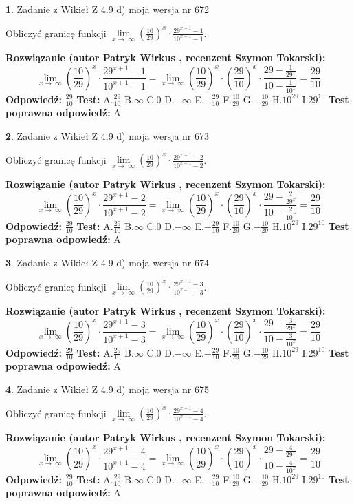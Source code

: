 \documentclass[12pt, a4paper]{article}
\theoremstyle{definition} %
\newtheorem{zad}{}
\newcommand{\zadStart}[1]{\begin{zad}#1\newline}
\newcommand{\zadStop}{\end{zad}}
\newcommand{\rozwStart}[2]{\noindent \textbf{Rozwiązanie (autor #1 , recenzent #2): }\newline}
\newcommand{\rozwStop}{\newline}
\newcommand{\odpStart}{\noindent \textbf{Odpowiedź:}\newline}
\newcommand{\odpStop}{\newline}
\newcommand{\testStart}{\noindent \textbf{Test:}\newline}
\newcommand{\testStop}{\newline}
\newcommand{\kluczStart}{\noindent \textbf{Test poprawna odpowiedź:}\newline}
\newcommand{\kluczStop}{\newline}
\begin{document}
\zadStart{Zadanie z Wikieł Z 4.9 d) moja wersja nr 672}


Obliczyć granicę funkcji  $\lim\limits_{x\to\ \infty}(\frac{10}{29})^{x}\cdot\frac{29^{x+1}-1}{10^{x+1}-1}$.
\zadStop
\rozwStart{Patryk Wirkus}{Szymon Tokarski}
$$\lim\limits_{x\to\ \infty}(\frac{10}{29})^{x}\cdot\frac{29^{x+1}-1}{10^{x+1}-1}=\lim\limits_{x\to\ \infty}(\frac{10}{29})^{x}\cdot(\frac{29}{10})^{x} \cdot \frac{29-\frac{1}{29^{x}}}{10-\frac{1}{10^{x}}} = \frac{29}{10}$$
\rozwStop
\odpStart
$\frac{29}{10}$
\odpStop
\testStart
A.$\frac{29}{10}$ B.$\infty$ C.$0$ D.$-\infty$ E.$-\frac{29}{10}$
F.$\frac{10}{29}$ G.$-\frac{10}{29}$
H.$10^{29}$
I.$29^{10}$
\testStop
\kluczStart
A
\kluczStop



\zadStart{Zadanie z Wikieł Z 4.9 d) moja wersja nr 673}


Obliczyć granicę funkcji  $\lim\limits_{x\to\ \infty}(\frac{10}{29})^{x}\cdot\frac{29^{x+1}-2}{10^{x+1}-2}$.
\zadStop
\rozwStart{Patryk Wirkus}{Szymon Tokarski}
$$\lim\limits_{x\to\ \infty}(\frac{10}{29})^{x}\cdot\frac{29^{x+1}-2}{10^{x+1}-2}=\lim\limits_{x\to\ \infty}(\frac{10}{29})^{x}\cdot(\frac{29}{10})^{x} \cdot \frac{29-\frac{2}{29^{x}}}{10-\frac{2}{10^{x}}} = \frac{29}{10}$$
\rozwStop
\odpStart
$\frac{29}{10}$
\odpStop
\testStart
A.$\frac{29}{10}$ B.$\infty$ C.$0$ D.$-\infty$ E.$-\frac{29}{10}$
F.$\frac{10}{29}$ G.$-\frac{10}{29}$
H.$10^{29}$
I.$29^{10}$
\testStop
\kluczStart
A
\kluczStop



\zadStart{Zadanie z Wikieł Z 4.9 d) moja wersja nr 674}


Obliczyć granicę funkcji  $\lim\limits_{x\to\ \infty}(\frac{10}{29})^{x}\cdot\frac{29^{x+1}-3}{10^{x+1}-3}$.
\zadStop
\rozwStart{Patryk Wirkus}{Szymon Tokarski}
$$\lim\limits_{x\to\ \infty}(\frac{10}{29})^{x}\cdot\frac{29^{x+1}-3}{10^{x+1}-3}=\lim\limits_{x\to\ \infty}(\frac{10}{29})^{x}\cdot(\frac{29}{10})^{x} \cdot \frac{29-\frac{3}{29^{x}}}{10-\frac{3}{10^{x}}} = \frac{29}{10}$$
\rozwStop
\odpStart
$\frac{29}{10}$
\odpStop
\testStart
A.$\frac{29}{10}$ B.$\infty$ C.$0$ D.$-\infty$ E.$-\frac{29}{10}$
F.$\frac{10}{29}$ G.$-\frac{10}{29}$
H.$10^{29}$
I.$29^{10}$
\testStop
\kluczStart
A
\kluczStop



\zadStart{Zadanie z Wikieł Z 4.9 d) moja wersja nr 675}


Obliczyć granicę funkcji  $\lim\limits_{x\to\ \infty}(\frac{10}{29})^{x}\cdot\frac{29^{x+1}-4}{10^{x+1}-4}$.
\zadStop
\rozwStart{Patryk Wirkus}{Szymon Tokarski}
$$\lim\limits_{x\to\ \infty}(\frac{10}{29})^{x}\cdot\frac{29^{x+1}-4}{10^{x+1}-4}=\lim\limits_{x\to\ \infty}(\frac{10}{29})^{x}\cdot(\frac{29}{10})^{x} \cdot \frac{29-\frac{4}{29^{x}}}{10-\frac{4}{10^{x}}} = \frac{29}{10}$$
\rozwStop
\odpStart
$\frac{29}{10}$
\odpStop
\testStart
A.$\frac{29}{10}$ B.$\infty$ C.$0$ D.$-\infty$ E.$-\frac{29}{10}$
F.$\frac{10}{29}$ G.$-\frac{10}{29}$
H.$10^{29}$
I.$29^{10}$
\testStop
\kluczStart
A
\kluczStop
\end{document}
